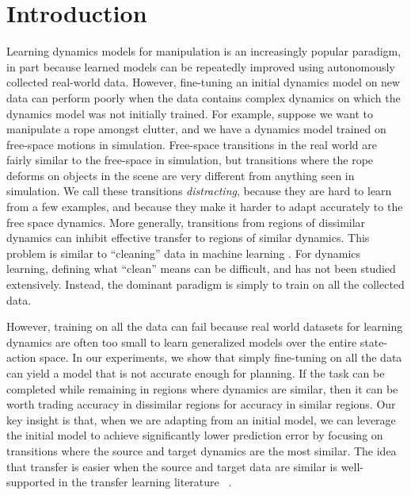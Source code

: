\section{Introduction} \label{ICRA:sec:intro}

 Learning dynamics models for manipulation is an increasingly popular paradigm, in part because learned models can be repeatedly improved using autonomously collected real-world data. However, fine-tuning an initial dynamics model on new data can perform poorly when the data contains complex dynamics on which the dynamics model was not initially trained. For example, suppose we want to manipulate a rope amongst clutter, and we have a dynamics model trained on free-space motions in simulation. Free-space transitions in the real world are fairly similar to the free-space in simulation, but transitions where the rope deforms on objects in the scene are very different from anything seen in simulation. We call these transitions \emph{distracting}, because they are hard to learn from a few examples, and because they make it harder to adapt accurately to the free space dynamics. More generally, transitions from regions of dissimilar dynamics can inhibit effective transfer to regions of similar dynamics. This problem is similar to ``cleaning'' data in machine learning \cite{mislabeled99,filtering21,anomoly22}. For dynamics learning, defining what ``clean'' means can be difficult, and has not been studied extensively. Instead, the dominant paradigm is simply to train on all the collected data.

However, training on all the data can fail because real world datasets for learning dynamics are often too small to learn generalized models over the entire state-action space. In our experiments, we show that simply fine-tuning on all the data can yield a model that is not accurate enough for planning. If the task can be completed while remaining in regions where dynamics are similar, then it can be worth trading accuracy in dissimilar regions for accuracy in similar regions.
Our key insight is that, when we are adapting from an initial model, we can leverage the initial model to achieve significantly lower prediction error by focusing on transitions where the source and target dynamics are the most similar. The idea that transfer is easier when the source and target data are similar is well-supported in the transfer learning literature ~\cite{sorocky2020experience,bocsi2013alignment}.

